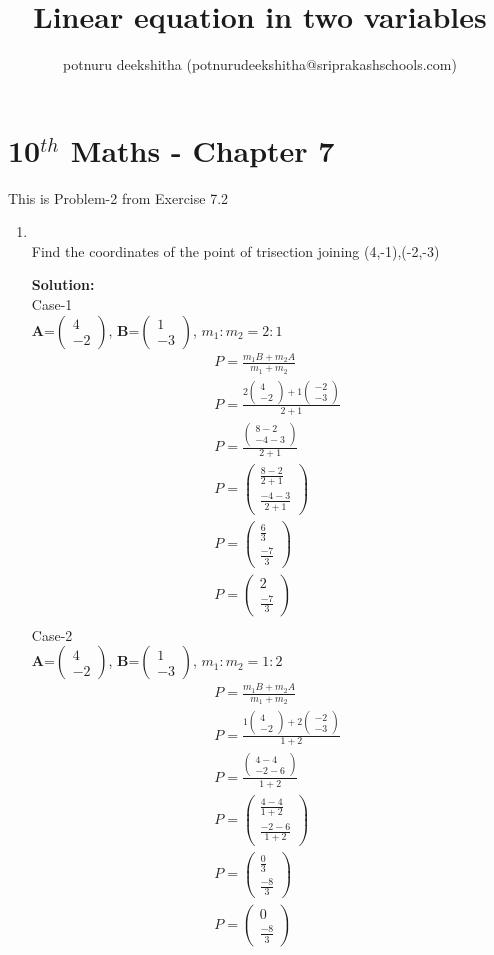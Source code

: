 \documentclass[12pt]{article}
\title{Linear equation in two variables}
\author{potnuru deekshitha (potnurudeekshitha@sriprakashschools.com)}
\newcommand{\myvec}[1]{\ensuremath{\begin{pmatrix}#1\end{pmatrix}}}
\newcommand{\solution}{\noindent \textbf{Solution: }}
\let\vec\mathbf
\begin{document}
\maketitle
\section*{10$^{th}$ Maths - Chapter 7}
This is Problem-2 from Exercise 7.2
\begin{enumerate}
\item \\ Find the coordinates of the point of trisection joining (4,-1),(-2,-3)

\solution\\
Case-1\\
$\vec{A}$=\myvec{4\\-2}, $\vec{B}$=\myvec{1\\-3},
$m_1:m_2=2:1$
\begin{align}
&P=\frac{m_1B+m_2A}{m_1+m_2}\\
&P=\frac{2\myvec{4\\-2}+1\myvec{-2\\-3}}{2+1}\\
&P=\frac{\myvec{8-2\\-4-3}}{2+1}\\
&P=\myvec{\frac{8-2}{2+1}\\\frac{-4-3}{2+1}}\\
&P=\myvec{\frac{6}{3}\\\frac{-7}{3}}\\
&P=\myvec{2\\\frac{-7}{3}}\\
\end{align}
Case-2\\
$\vec{A}$=\myvec{4\\-2}, $\vec{B}$=\myvec{1\\-3},
$m_1:m_2=1:2$
\begin{align}
&P=\frac{m_1B+m_2A}{m_1+m_2}\\
&P=\frac{1\myvec{4\\-2}+2\myvec{-2\\-3}}{1+2}\\
&P=\frac{\myvec{4-4\\-2-6}}{1+2}\\
&P=\myvec{\frac{4-4}{1+2}\\\frac{-2-6}{1+2}}\\
&P=\myvec{\frac{0}{3}\\\frac{-8}{3}}\\
&P=\myvec{0\\\frac{-8}{3}}\\
\end{align}



\end{enumerate}
\end{document}
